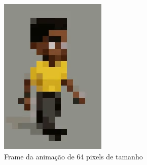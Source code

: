 \begin{figure}[htbp]
\begin{subfigure}{0.21\linewidth}
        \includegraphics[width=0.85\linewidth]{figs/godmodAI/print64.PNG}
        \caption{\small Frame da animação de 64 pixels de tamanho}
        \label{fig:godmodAIFrame64}
    \end{subfigure}
    \begin{subfigure}{0.21\linewidth}

\end{subfigure}
\end{figure}
